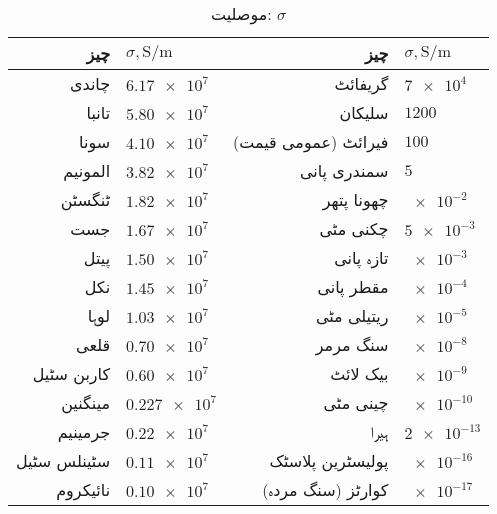 {\renewcommand{\arraystretch}{1.2}
\begin{table}
\caption*{موصلیت: $\sigma$}
\centering
\begin{tabular}{r | l || r | l}
\hline 
چیز & $\sigma, \si{\siemens \per \meter}$ & چیز & $\sigma, \si{\siemens \per \meter}$\\
\hline
چاندی &$\num{6.17e7}$ &گریفائٹ & $\num{7e4}$\\
تانبا & $\num{5.80e7}$&سلیکان & $\num{1200}$\\
سونا & $\num{4.10e7}$&فیرائٹ (عمومی قیمت) &$\num{100}$ \\
المونیم &$\num{3.82e7}$ &سمندری پانی &$\num{5}$ \\
ٹنگسٹن &$\num{1.82e7}$ &چھونا پتھر &$\num{e-2}$ \\
جست & $\num{1.67e7}$& چکنی مٹی&$\num{5e-3}$ \\
پیتل &$\num{1.50e7}$ & تازہ پانی&$\num{e-3}$ \\
نکل &$\num{1.45e7}$ & مقطر پانی& $\num{e-4}$\\
لوہا &$\num{1.03e7}$ & ریتیلی مٹی & $\num{e-5}$\\
قلعی &$\num{0.70e7}$ &سنگ مرمر &$\num{e-8}$ \\
کاربن سٹیل & $\num{0.60e7}$& بیک لائٹ & $\num{e-9}$\\
مینگنین & $\num{0.227e7}$ & چینی مٹی &$\num{e-10}$ \\
جرمینیم & $\num{0.22e7}$& ہیرا&$\num{2e-13}$ \\
سٹینلس سٹیل &$\num{0.11e7}$ &پولیسٹرین پلاسٹک &$\num{e-16}$ \\
نائیکروم & $\num{0.10e7}$&کوارٹز (سنگ مردہ) &$\num{e-17}$ \\
\end{tabular}
\label{جدول_جدول_موصلیت_کے_مستقل}
\end{table}
}
